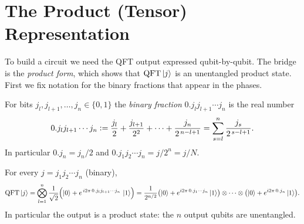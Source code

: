 \section{The Product (Tensor) Representation}

To build a circuit we need the QFT output expressed qubit-by-qubit. The bridge
is the \emph{product form}, which shows that $\mathrm{QFT}\ket{j}$ is an unentangled
product state. First we fix notation for the binary fractions that appear in the
phases.

\begin{definition}\label{l5:def:binfrac}
For bits $j_l, j_{l+1}, \dots, j_n \in\{0,1\}$ the \emph{binary fraction}
$0.j_l j_{l+1}\cdots j_n$ is the real number
\[
  0.j_l j_{l+1}\cdots j_n
   \vcentcolon= \frac{j_l}{2} + \frac{j_{l+1}}{2^{2}} + \cdots + \frac{j_n}{2^{\,n-l+1}}
   = \sum_{s=l}^{n} \frac{j_s}{2^{\,s-l+1}} .
\]
In particular $0.j_n = j_n/2$ and $0.j_1 j_2\cdots j_n = j/2^{n} = j/N$.
\end{definition}

\begin{theorem}\label{l5:thm:product}
For every $j = j_1 j_2\cdots j_n$ (binary),
\[
  \mathrm{QFT}\ket{j}
   = \bigotimes_{l=1}^{n}
       \frac{1}{\sqrt 2}\Bigl(\ket{0}
        + e^{\,i 2\pi\, 0.j_l j_{l+1}\cdots j_n}\,\ket{1}\Bigr)
   = \frac{1}{2^{n/2}}
     \bigl(\ket{0}+e^{i2\pi\,0.j_1\cdots j_n}\ket{1}\bigr)\otimes\cdots\otimes
     \bigl(\ket{0}+e^{i2\pi\,0.j_n}\ket{1}\bigr) .
\]
In particular the output is a product state: the $n$ output qubits are
unentangled.
\end{theorem}

